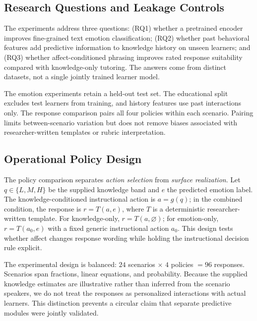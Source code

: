 \documentclass[conference]{IEEEtran}
\begin{document}
\subsection{Research Questions and Leakage Controls}
The experiments address three questions: (RQ1) whether a pretrained encoder improves fine-grained text emotion classification; (RQ2) whether past behavioral features add predictive information to knowledge history on unseen learners; and (RQ3) whether affect-conditioned phrasing improves rated response suitability compared with knowledge-only tutoring. The answers come from distinct datasets, not a single jointly trained learner model.

The emotion experiments retain a held-out test set. The educational split excludes test learners from training, and history features use past interactions only. The response comparison pairs all four policies within each scenario. Pairing limits between-scenario variation but does not remove biases associated with researcher-written templates or rubric interpretation.

\subsection{Operational Policy Design}
The policy comparison separates \emph{action selection} from \emph{surface realization}. Let $q\in\{L,M,H\}$ be the supplied knowledge band and $e$ the predicted emotion label. The knowledge-conditioned instructional action is $a=g(q)$; in the combined condition, the response is $r=T(a,e)$, where $T$ is a deterministic researcher-written template. For knowledge-only, $r=T(a,\varnothing)$; for emotion-only, $r=T(a_0,e)$ with a fixed generic instructional action $a_0$. This design tests whether affect changes response wording while holding the instructional decision rule explicit.

The experimental design is balanced: $24$ scenarios $\times$ $4$ policies $=96$ responses. Scenarios span fractions, linear equations, and probability. Because the supplied knowledge estimates are illustrative rather than inferred from the scenario speakers, we do not treat the responses as personalized interactions with actual learners. This distinction prevents a circular claim that separate predictive modules were jointly validated.
\end{document}
